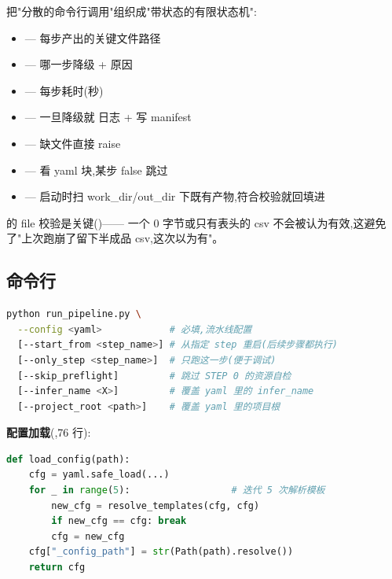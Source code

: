  把"分散的命令行调用"组织成"带状态的有限状态机":
\begin{itemize}
    \item {} — 每步产出的关键文件路径
    \item {} — 哪一步降级 + 原因
    \item {} — 每步耗时(秒)
    \item {} — 一旦降级就 \code{[DEGRADED]} 日志 + 写 manifest
    \item {} — 缺文件直接 raise
    \item {} — 看 yaml  块,某步 false 跳过
    \item {} — 启动时扫 work\_dir/out\_dir 下既有产物,符合校验就回填进 
\end{itemize}

\begin{repobox}[可重复要点 \#1]
 的 file 校验是关键()—— 一个 0 字节或只有表头的 csv 不会被认为有效,这避免了"上次跑崩了留下半成品 csv,这次以为有"。
\end{repobox}

\subsection{命令行}

\begin{lstlisting}[language=bash]
python run_pipeline.py \
  --config <yaml>            # 必填,流水线配置
  [--start_from <step_name>] # 从指定 step 重启(后续步骤都执行)
  [--only_step <step_name>]  # 只跑这一步(便于调试)
  [--skip_preflight]         # 跳过 STEP 0 的资源自检
  [--infer_name <X>]         # 覆盖 yaml 里的 infer_name
  [--project_root <path>]    # 覆盖 yaml 里的项目根
\end{lstlisting}

\textbf{配置加载}(,76 行):
\begin{lstlisting}[language=Python]
def load_config(path):
    cfg = yaml.safe_load(...)
    for _ in range(5):                  # 迭代 5 次解析模板
        new_cfg = resolve_templates(cfg, cfg)
        if new_cfg == cfg: break
        cfg = new_cfg
    cfg["_config_path"] = str(Path(path).resolve())
    return cfg
\end{lstlisting}

